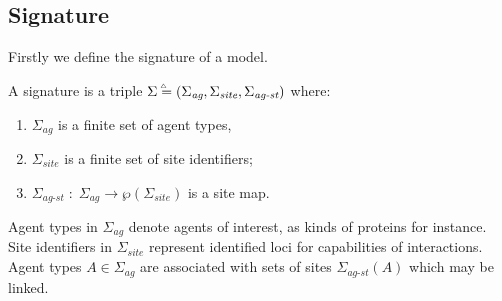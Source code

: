 \documentclass{entcs}
\newcommand{\agentname}{\signaturesymb_{\textit{ag}}}
\newcommand{\sitename}{\signaturesymb_{\textit{site}}}
\newcommand{\linksite}{\signaturesymb_{\textit{ag-st}}}
\newcommand{\signaturesymb}{\Sigma}
\newcommand{\signaturetuple}{(\agentname,\sitename,\linksite)}
\newcommand{\bydef}{\stackrel{\scalebox{0.8}{\!\!$\scriptscriptstyle{\triangle}$}}{=}}
\begin{document}
\subsection{Signature}

Firstly we define the signature of a model.
\begin{defn}[signature]
\label{def:signature}
A signature is a triple $\signaturesymb\bydef\signaturetuple$ where: \begin{enumerate}\item $\agentname$ is a finite set of agent types, \item $\sitename$ is a finite set of site identifiers; \item $\linksite\;:\;\agentname \rightarrow \wp(\sitename)$ is a site map.
\end{enumerate}\end{defn}


Agent types in $\agentname$ denote agents of interest, as kinds of proteins for instance.
Site identifiers in $\sitename$ represent identified loci for capabilities of interactions.
Agent types $A\in\agentname$ are associated with sets of sites $\linksite(A)$ which may be linked.
\end{document}
